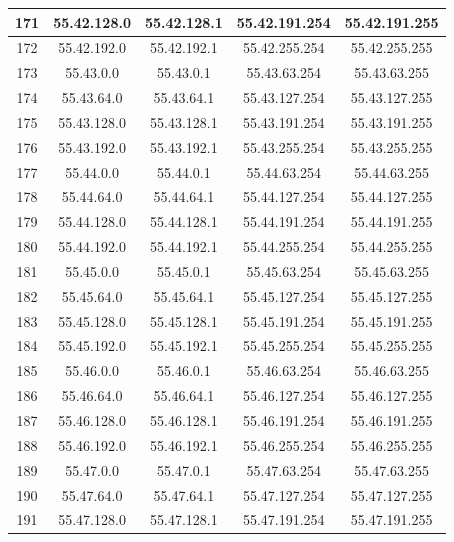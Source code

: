\documentclass[letterpaper,12pt]{article}
\begin{document}
\begin{center}
\begin{longtable}{|c|c|c|c|c|}
                171 & 55.42.128.0 & 55.42.128.1 & 55.42.191.254 & 55.42.191.255 \\ \hline
                172 & 55.42.192.0 & 55.42.192.1 & 55.42.255.254 & 55.42.255.255 \\ \hline
                173 & 55.43.0.0 & 55.43.0.1 & 55.43.63.254 & 55.43.63.255 \\ \hline
                174 & 55.43.64.0 & 55.43.64.1 & 55.43.127.254 & 55.43.127.255 \\ \hline
                175 & 55.43.128.0 & 55.43.128.1 & 55.43.191.254 & 55.43.191.255 \\ \hline
                176 & 55.43.192.0 & 55.43.192.1 & 55.43.255.254 & 55.43.255.255 \\ \hline
                177 & 55.44.0.0 & 55.44.0.1 & 55.44.63.254 & 55.44.63.255 \\ \hline
                178 & 55.44.64.0 & 55.44.64.1 & 55.44.127.254 & 55.44.127.255 \\ \hline
                179 & 55.44.128.0 & 55.44.128.1 & 55.44.191.254 & 55.44.191.255 \\ \hline
                180 & 55.44.192.0 & 55.44.192.1 & 55.44.255.254 & 55.44.255.255 \\ \hline
                181 & 55.45.0.0 & 55.45.0.1 & 55.45.63.254 & 55.45.63.255 \\ \hline
                182 & 55.45.64.0 & 55.45.64.1 & 55.45.127.254 & 55.45.127.255 \\ \hline
                183 & 55.45.128.0 & 55.45.128.1 & 55.45.191.254 & 55.45.191.255 \\ \hline
                184 & 55.45.192.0 & 55.45.192.1 & 55.45.255.254 & 55.45.255.255 \\ \hline
                185 & 55.46.0.0 & 55.46.0.1 & 55.46.63.254 & 55.46.63.255 \\ \hline
                186 & 55.46.64.0 & 55.46.64.1 & 55.46.127.254 & 55.46.127.255 \\ \hline
                187 & 55.46.128.0 & 55.46.128.1 & 55.46.191.254 & 55.46.191.255 \\ \hline
                188 & 55.46.192.0 & 55.46.192.1 & 55.46.255.254 & 55.46.255.255 \\ \hline
                189 & 55.47.0.0 & 55.47.0.1 & 55.47.63.254 & 55.47.63.255 \\ \hline
                190 & 55.47.64.0 & 55.47.64.1 & 55.47.127.254 & 55.47.127.255 \\ \hline
                191 & 55.47.128.0 & 55.47.128.1 & 55.47.191.254 & 55.47.191.255 \\ \hline

\end{longtable}
\end{center}
\end{document}
